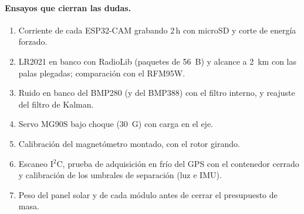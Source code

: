 \paragraph{Ensayos que cierran las dudas.}
\begin{enumerate}[leftmargin=*]
  \item Corriente de cada ESP32-CAM grabando 2\,h con microSD y corte de energía forzado.
  \item LR2021 en banco con RadioLib (paquetes de \SI{56}{B}) y alcance a \SI{2}{km} con las
        palas plegadas; comparación con el RFM95W.
  \item Ruido en banco del BMP280 (y del BMP388) con el filtro interno, y reajuste del filtro de
        Kalman.
  \item Servo MG90S bajo choque (\SI{30}{G}) con carga en el eje.
  \item Calibración del magnetómetro montado, con el rotor girando.
  \item Escaneo I$^2$C, prueba de adquisición en frío del GPS con el contenedor cerrado y
        calibración de los umbrales de separación (luz e IMU).
  \item Peso del panel solar y de cada módulo antes de cerrar el presupuesto de masa.
\end{enumerate}
